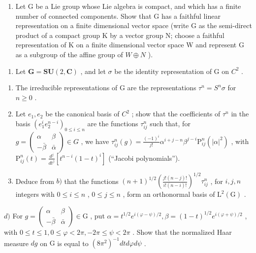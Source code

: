 \begin{enumerate}
\begin{enumerate}
\def\labelenumi{\arabic{enumi})}
\setcounter{enumi}{7}
\tightlist
\item
  Let G be a Lie group whose Lie algebra is compact, and which has a finite number of connected components. Show that G has a faithful linear representation on a finite dimensional vector space (write G as the semi-direct product of a compact group K by a vector group N; choose a faithful representation of K on a finite dimensional vector space W and represent G as a subgroup of the affine group of \(W \oplus N\) ).
\end{enumerate}


\begin{enumerate}
\def\labelenumi{\arabic{enumi})}
\tightlist
\item
  Let \(\mathbf{G} = \mathbf{SU}(2, \mathbf{C})\) , and let \(\sigma\) be the identity representation of G on \(C^{2}\) .
\end{enumerate}

\begin{enumerate}
\def\labelenumi{\alph{enumi})}
\item
  The irreducible representations of G are the representations \(\tau^{n} = S^{n}\sigma\) for \(n \geq 0\) .
\item
  Let \(e_{1}, e_{2}\) be the canonical basis of \(C^{2}\) ; show that the coefficients of \(\tau^{n}\) in the basis \((e_{1}^{i}e_{2}^{n-i})_{0\leq i\leq n}\) are the functions \(\tau_{ij}^{n}\) such that, for \(g=\begin{pmatrix}\alpha&\beta\\-\bar{\beta}&\bar{\alpha}\end{pmatrix}\in G\) , we have \(\tau_{ij}^{n}(g)=\frac{(-1)^{i}}{j!}\alpha^{i+j-n}\beta^{j-i}\mathrm{P}_{ij}^{n}(|\alpha|^{2})\) , with \(\mathrm{P}_{ij}^{n}(t)=\frac{d^{j}}{dt^{j}}\left[t^{n-i}(1-t)^{i}\right]\) (``Jacobi polynomials'').
\item
  Deduce from \(b)\) that the functions \((n + 1)^{1/2}\left(\frac{j!(n - j)!}{i!(n - i)!}\right)^{1/2}\tau_{ij}^n\) , for \(i,j,n\) integers with \(0\leq i\leq n\) , \(0\leq j\leq n\) , form an orthonormal basis of \(\mathrm{L}^2 (\mathrm{G})\) .
\end{enumerate}

\(d)\) For \(g = \left( \begin{array}{cc}\alpha & \beta \\ -\bar{\beta} & \bar{\alpha} \end{array} \right)\in \mathrm{G}\) , put \(\alpha = t^{1 / 2}e^{i(\varphi -\psi) / 2},\beta = (1 - t)^{1 / 2}e^{i(\varphi +\psi) / 2}\) , with \(0\leq t\leq 1,0\leq \varphi < 2\pi , - 2\pi \leq \psi < 2\pi\) . Show that the normalized Haar measure \(dg\) on \(\mathrm{G}\) is equal to \((8\pi^2)^{-1}dtd\varphi d\psi\) .


\end{enumerate}
